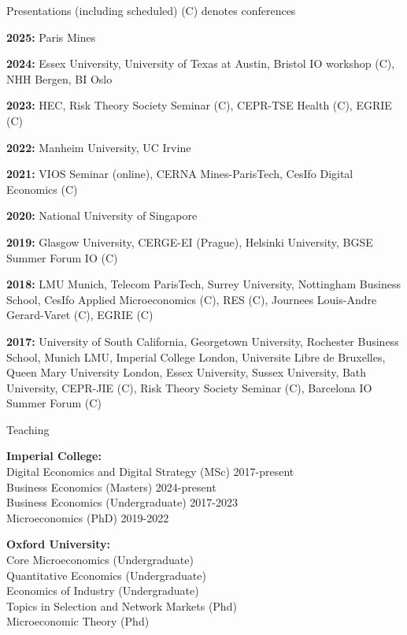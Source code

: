 \documentclass{resume}
\begin{document}
\begin{rSection}{Presentations (including scheduled) \tiny{(C) denotes conferences}}

\textbf{2025:} Paris Mines

\textbf{2024:} Essex University, University of Texas at Austin, Bristol IO workshop (C), NHH Bergen, BI Oslo

\textbf{2023:} HEC,  Risk Theory Society Seminar (C), CEPR-TSE Health (C), EGRIE (C)

\textbf{2022:} Manheim University, UC Irvine

\textbf{2021:} VIOS Seminar (online), CERNA Mines-ParisTech, CesIfo Digital Economics (C)

\textbf{2020:} National University of Singapore

\textbf{2019:} Glasgow University, CERGE-EI (Prague), Helsinki University, BGSE Summer Forum IO (C)

\textbf{2018:} LMU Munich, Telecom ParisTech, Surrey University, Nottingham Business School, CesIfo Applied Microeconomics (C), RES (C), Journees Louis-Andre Gerard-Varet (C), EGRIE (C)

\textbf{2017:} University of South California, Georgetown University, Rochester Business School, Munich LMU, Imperial College London, Universite Libre de Bruxelles, Queen Mary University London, Essex University, Sussex University, Bath University, CEPR-JIE (C), Risk Theory Society Seminar (C), Barcelona IO Summer Forum (C) 

\end{rSection}


\begin{rSection}{Teaching}

\textbf{Imperial College:} \\ 
Digital Economics and Digital Strategy (MSc) \hfill {2017-present} \\ 
Business Economics (Masters) \hfill {2024-present} \\ 
Business Economics (Undergraduate) \hfill {2017-2023} \\  
Microeconomics (PhD) \hfill {2019-2022}

\textbf{Oxford University:} \\
Core Microeconomics (Undergraduate) \\ 
Quantitative Economics (Undergraduate) \\ 
Economics of Industry (Undergraduate) \\ 
Topics in Selection and Network Markets (Phd) \\ 
Microeconomic Theory (Phd)

\end{rSection}
\end{document}
